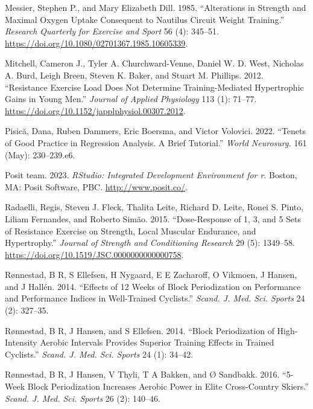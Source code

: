 \documentclass[
  letterpaper,
  DIV=11,
  numbers=noendperiod]{scrreprt}
\newlength{\cslhangindent}
\newenvironment{CSLReferences}[2] %
 {\begin{list}{}{%
  \setlength{\itemindent}{0pt}
  \setlength{\leftmargin}{0pt}
  \setlength{\parsep}{0pt}
  \ifodd #1
   \setlength{\leftmargin}{\cslhangindent}
   \setlength{\itemindent}{-1\cslhangindent}
  \fi
  \setlength{\itemsep}{#2\baselineskip}}}
 {\end{list}}
\begin{document}
\begin{CSLReferences}{1}{0}
Messier, Stephen P., and Mary Elizabeth Dill. 1985. {``Alterations in
Strength and Maximal Oxygen Uptake Consequent to Nautilus Circuit Weight
Training.''} \emph{Research Quarterly for Exercise and Sport} 56 (4):
345--51. \url{https://doi.org/10.1080/02701367.1985.10605339}.

Mitchell, Cameron J., Tyler A. Churchward-Venne, Daniel W. D. West,
Nicholas A. Burd, Leigh Breen, Steven K. Baker, and Stuart M. Phillips.
2012. {``Resistance Exercise Load Does Not Determine Training-Mediated
Hypertrophic Gains in Young Men.''} \emph{Journal of Applied Physiology}
113 (1): 71--77. \url{https://doi.org/10.1152/japplphysiol.00307.2012}.

Pisică, Dana, Ruben Dammers, Eric Boersma, and Victor Volovici. 2022.
{``Tenets of Good Practice in Regression Analysis. A Brief Tutorial.''}
\emph{World Neurosurg.} 161 (May): 230--239.e6.

Posit team. 2023. \emph{RStudio: Integrated Development Environment for
r}. Boston, MA: Posit Software, PBC. \url{http://www.posit.co/}.

Radaelli, Regis, Steven J. Fleck, Thalita Leite, Richard D. Leite, Ronei
S. Pinto, Liliam Fernandes, and Roberto Simão. 2015. {``Dose-Response of
1, 3, and 5 Sets of Resistance Exercise on Strength, Local Muscular
Endurance, and Hypertrophy.''} \emph{Journal of Strength and
Conditioning Research} 29 (5): 1349--58.
\url{https://doi.org/10.1519/JSC.0000000000000758}.

Rønnestad, B R, S Ellefsen, H Nygaard, E E Zacharoff, O Vikmoen, J
Hansen, and J Hallén. 2014. {``Effects of 12 Weeks of Block
Periodization on Performance and Performance Indices in Well-Trained
Cyclists.''} \emph{Scand. J. Med. Sci. Sports} 24 (2): 327--35.

Rønnestad, B R, J Hansen, and S Ellefsen. 2014. {``Block Periodization
of High-Intensity Aerobic Intervals Provides Superior Training Effects
in Trained Cyclists.''} \emph{Scand. J. Med. Sci. Sports} 24 (1):
34--42.

Rønnestad, B R, J Hansen, V Thyli, T A Bakken, and Ø Sandbakk. 2016.
{``5-Week Block Periodization Increases Aerobic Power in Elite
Cross-Country Skiers.''} \emph{Scand. J. Med. Sci. Sports} 26 (2):
140--46.


\end{CSLReferences}
\end{document}
